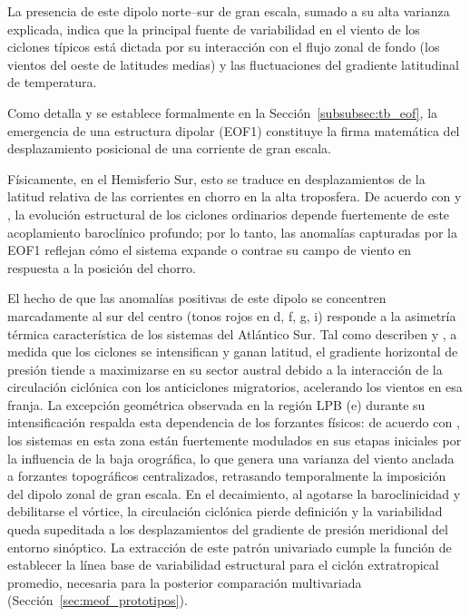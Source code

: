 La presencia de este dipolo norte--sur de gran escala, sumado a su alta varianza explicada, indica que la principal fuente de variabilidad en el viento de los ciclones típicos está dictada por su interacción con el flujo zonal de fondo (los vientos del oeste de latitudes medias) y las fluctuaciones del gradiente latitudinal de temperatura. 

Como detalla \citet{hannachi2007empirical} y se establece formalmente en la Sección~\ref{subsubsec:tb_eof}, la emergencia de una estructura dipolar (EOF1) constituye la firma matemática del desplazamiento posicional de una corriente de gran escala.

Físicamente, en el Hemisferio Sur, esto se traduce en desplazamientos de la latitud relativa de las corrientes en chorro en la alta troposfera.
De acuerdo con \citet{hoskins2005new} y \citet{dossantos2023response}, la evolución estructural de los ciclones ordinarios depende fuertemente de este acoplamiento baroclínico profundo; por lo tanto, las anomalías capturadas por la EOF1 reflejan cómo el sistema expande o contrae su campo de viento en respuesta a la posición del chorro. 

El hecho de que las anomalías positivas de este dipolo se concentren marcadamente al sur del centro (tonos rojos en d, f, g, i) responde a la asimetría térmica característica de los sistemas del Atlántico Sur. 
Tal como describen \citet{sinclair1997objective} y \citet{reboita2010south}, a medida que los ciclones se intensifican y ganan latitud, el gradiente horizontal de presión tiende a maximizarse en su sector austral debido a la interacción de la circulación ciclónica con los anticiclones migratorios, acelerando los vientos en esa franja. 
La excepción geométrica observada en la región LPB (e) durante su intensificación respalda esta dependencia de los forzantes físicos: de acuerdo con \citet{gramcianinov2019properties}, los sistemas en esta zona están fuertemente modulados en sus etapas iniciales por la influencia de la baja orográfica, lo que genera una varianza del viento anclada a forzantes topográficos centralizados, retrasando temporalmente la imposición del dipolo zonal de gran escala. 
En el decaimiento, al agotarse la baroclinicidad y debilitarse el vórtice, la circulación ciclónica pierde definición y la variabilidad queda supeditada a los desplazamientos del gradiente de presión meridional del entorno sinóptico.
La extracción de este patrón univariado cumple la función de establecer la línea base de variabilidad estructural para el ciclón extratropical promedio, necesaria para la posterior comparación multivariada (Sección~\ref{sec:meof_prototipos}). 

